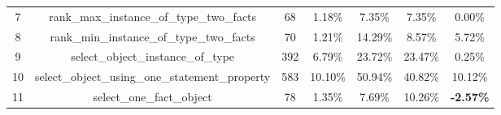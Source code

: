 \begin{table}[h!]
{\begin{tabular}{|c|c|cc|cc|c|}
    7                            & rank\_max\_instance\_of\_type\_two\_facts                                                                              & 68                                                  & 1.18\%                                                                          & 7.35\%                                                                                                 & 7.35\%                                                                                 & 0.00\%                                  \\
    8                            & rank\_min\_instance\_of\_type\_two\_facts                                                                              & 70                                                  & 1.21\%                                                                          & 14.29\%                                                                                                & 8.57\%                                                                                 & 5.72\%                                  \\
    9                            & select\_object\_instance\_of\_type                                                                                     & 392                                                 & 6.79\%                                                                          & 23.72\%                                                                                                & 23.47\%                                                                                & 0.25\%                                  \\
    10                           & select\_object\_using\_one\_statement\_property                                                                        & 583                                                 & 10.10\%                                                                         & 50.94\%                                                                                                & 40.82\%                                                                                & 10.12\%                                 \\
    11                           & select\_one\_fact\_object                                                                                              & 78                                                  & 1.35\%                                                                          & 7.69\%                                                                                                 & 10.26\%                                                                                & \textbf{-2.57\%}                        \\

\end{tabular}}
\end{table}

